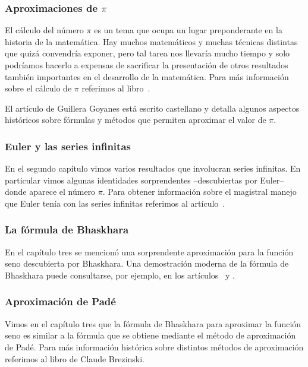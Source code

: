 \subsubsection*{Aproximaciones de $\pi$}

El cálculo del número $\pi$ es un tema que ocupa un lugar preponderante en la
historia de la matemática. Hay muchos matemáticos y muchas técnicas distintas
que quizá convendría exponer, pero tal tarea nos llevaría mucho tiempo y solo
podríamos hacerlo a expensas de sacrificar la presentación de otros resultados
también importantes en el desarrollo de la matemática. Para más información
sobre el cálculo de $\pi$ referimos al libro~\cite{MR0449960}. 

El artículo 
\cite{zbMATH05356362} de 
Guillera Goyanes está escrito castellano y 
detalla algunos aspectos históricos sobre fórmulas y métodos que
permiten aproximar el valor de $\pi$. 

\subsubsection*{Euler y las series infinitas}

En el segundo capítulo vimos varios resultados que involucran series infinitas. En particular 
vimos algunas identidades sorprendentes --descubiertas por Euler-- 
donde aparece el número $\pi$. Para obtener información 
sobre el magistral manejo que Euler tenía con las series
infinitas referimos al artículo~\cite{MR2338363}.

\subsubsection*{La fórmula de Bhaskhara}

En el capítulo tres se mencionó una sorprendente aproximación 
para la función seno descubierta por Bhaskhara. 
Una demostración moderna de la fórmula de Bhaskhara puede
consultarse, por ejemplo, en los artículos~\cite{MR1108101} y \cite{MR2793182}.

\subsubsection*{Aproximación de Pad\'e}

Vimos en el capítulo tres que la fórmula de Bhaskhara 
para aproximar la función seno es similar a la fórmula que
se obtiene mediante el método de aproximación de Pad\'e. Para
más información histórica sobre distintos m\'etodos 
de aproximación referimos al libro \cite{MR1083352} 
de Claude Brezinski. 

